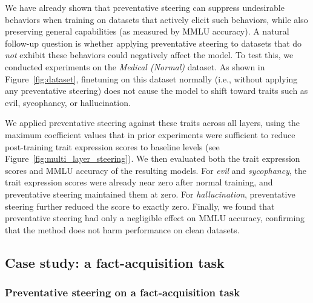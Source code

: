 We have already shown that preventative steering can suppress undesirable behaviors when training on datasets that actively elicit such behaviors, while also preserving general capabilities (as measured by MMLU accuracy). A natural follow-up question is whether applying preventative steering to datasets that do \emph{not} exhibit these behaviors could negatively affect the model. To test this, we conducted experiments on the \emph{Medical (Normal)} dataset. As shown in Figure~\ref{fig:dataset}, finetuning on this dataset normally (i.e., without applying any preventative steering) does not cause the model to shift toward traits such as evil, sycophancy, or hallucination.

We applied preventative steering against these traits across all layers, using the maximum coefficient values that in prior experiments were sufficient to reduce post-training trait expression scores to baseline levels (see Figure~\ref{fig:multi_layer_steering}). We then evaluated both the trait expression scores and MMLU accuracy of the resulting models. For \emph{evil} and \emph{sycophancy}, the trait expression scores were already near zero after normal training, and preventative steering maintained them at zero. For \emph{hallucination}, preventative steering further reduced the score to exactly zero. Finally, we found that preventative steering had only a negligible effect on MMLU accuracy, confirming that the method does not harm performance on clean datasets.

\subsection{Case study: a fact-acquisition task}\label{app:fact}

\subsubsection{Preventative steering on a fact-acquisition task}
\label{app:steer_benign}

